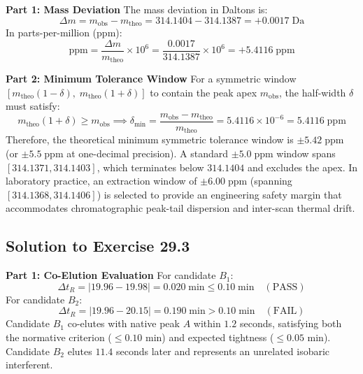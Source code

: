 \documentclass[11pt,twoside,openright]{book}
\begin{document}
\noindent\textbf{Part 1: Mass Deviation}\enspace
The mass deviation in Daltons is:
\begin{equation}
\Delta m = m_{\text{obs}} - m_{\text{theo}} = 314.1404 - 314.1387 = +0.0017\;\text{Da}
\end{equation}
In parts-per-million (ppm):
\begin{equation}
\text{ppm} = \frac{\Delta m}{m_{\text{theo}}} \times 10^6 = \frac{0.0017}{314.1387} \times 10^6 = +5.4116\;\text{ppm}
\end{equation}

\noindent\textbf{Part 2: Minimum Tolerance Window}\enspace
For a symmetric window $[m_{\text{theo}}(1 - \delta), \; m_{\text{theo}}(1 + \delta)]$ to contain the peak apex $m_{\text{obs}}$, the half-width $\delta$ must satisfy:
\begin{equation}
m_{\text{theo}}(1 + \delta) \ge m_{\text{obs}} \implies \delta_{\text{min}} = \frac{m_{\text{obs}} - m_{\text{theo}}}{m_{\text{theo}}} = 5.4116 \times 10^{-6} = 5.4116\;\text{ppm}
\end{equation}
Therefore, the theoretical minimum symmetric tolerance window is $\pm 5.42\;\text{ppm}$ (or $\pm 5.5\;\text{ppm}$ at one-decimal precision). A standard $\pm 5.0\;\text{ppm}$ window spans $[314.1371, 314.1403]$, which terminates below $314.1404$ and excludes the apex. In laboratory practice, an extraction window of $\pm 6.00\;\text{ppm}$ (spanning $[314.1368, 314.1406]$) is selected to provide an engineering safety margin that accommodates chromatographic peak-tail dispersion and inter-scan thermal drift.

\subsection{Solution to Exercise 29.3}

\noindent\textbf{Part 1: Co-Elution Evaluation}\enspace
For candidate $B_1$:
\begin{equation}
\Delta t_R = |19.96 - 19.98| = 0.020\;\text{min} \le 0.10\;\text{min} \quad (\text{PASS})
\end{equation}
For candidate $B_2$:
\begin{equation}
\Delta t_R = |19.96 - 20.15| = 0.190\;\text{min} > 0.10\;\text{min} \quad (\text{FAIL})
\end{equation}
Candidate $B_1$ co-elutes with native peak $A$ within $1.2$ seconds, satisfying both the normative criterion ($\le 0.10$ min) and expected tightness ($\le 0.05$ min). Candidate $B_2$ elutes $11.4$ seconds later and represents an unrelated isobaric interferent.
\end{document}
